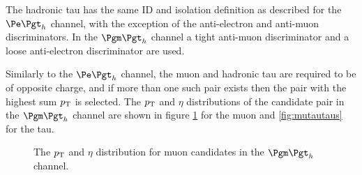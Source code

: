 The hadronic tau has the same ID and isolation definition as described for the $\etau$
channel, with the exception of the anti-electron and anti-muon discriminators.
In the $\mutau$ channel a tight anti-muon discriminator and a loose
anti-electron discriminator are used. 

Similarly to the $\etau$ channel, the muon and hadronic tau are required to be of 
opposite charge, and if more than one such pair exists then the pair with the highest sum $p_{\mathrm{T}}$
is selected. The $p_{\mathrm{T}}$ and $\eta$ distributions of the candidate pair in the
$\mutau$ channel are shown in figure \ref{fig:mutaumuons} for the muon and
\ref{fig:mutautaus} for the tau. 


\begin{figure}[htb]
\begin{center}

\end{center}
\caption{
The $p_{\mathrm{T}}$ and $\eta$ distribution for muon candidates in the $\mutau$
channel.
}
\label{fig:mutaumuons}
\end{figure}


